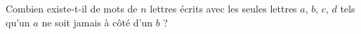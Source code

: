 Combien existe-t-il de mots de $n$ lettres écrits avec les seules lettres $a$, $b$, $c$, $d$ tels qu'un $a$ ne soit jamais à côté d'un $b$ ?
